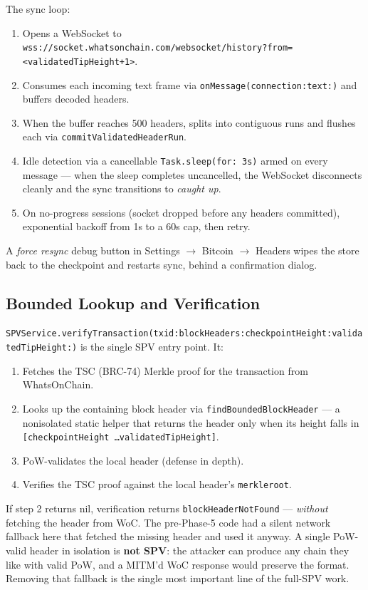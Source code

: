 \documentclass[a4paper, 11pt, openany]{book}
\begin{document}
The sync loop:

\begin{enumerate}
\item Opens a WebSocket to \texttt{wss://socket.whatsonchain.com/websocket/history?from=<validated\-Tip\-Height+1>}.
\item Consumes each incoming text frame via \texttt{on\-Message(connection:text:)} and buffers decoded headers.
\item When the buffer reaches 500 headers, splits into contiguous runs and flushes each via \texttt{com\-mit\-Val\-i\-dated\-Head\-er\-Run}.
\item Idle detection via a cancellable \texttt{Task.sleep(for: 3s)} armed on every message --- when the sleep completes uncancelled, the WebSocket disconnects cleanly and the sync transitions to \emph{caught up}.
\item On no-progress sessions (socket dropped before any headers committed), exponential backoff from 1s to a 60s cap, then retry.
\end{enumerate}

A \emph{force resync} debug button in Settings $\rightarrow$ Bitcoin $\rightarrow$ Headers wipes the store back to the checkpoint and restarts sync, behind a confirmation dialog.

\subsection{Bounded Lookup and Verification}

\texttt{SPV\-Service.verify\-Transaction(txid:block\-Headers:check\-point\-Height:validated\-Tip\-Height:)} is the single SPV entry point. It:

\begin{enumerate}
\item Fetches the TSC (BRC-74) Merkle proof for the transaction from WhatsOnChain.
\item Looks up the containing block header via \texttt{find\-Bounded\-Block\-Header} --- a nonisolated static helper that returns the header only when its height falls in \texttt{[checkpointHeight \ldots validatedTipHeight]}.
\item PoW-validates the local header (defense in depth).
\item Verifies the TSC proof against the local header's \texttt{merkleroot}.
\end{enumerate}

If step 2 returns nil, verification returns \texttt{block\-Header\-Not\-Found} --- \emph{without} fetching the header from WoC. The pre-Phase-5 code had a silent network fallback here that fetched the missing header and used it anyway. A single PoW-valid header in isolation is \textbf{not SPV}: the attacker can produce any chain they like with valid PoW, and a MITM'd WoC response would preserve the format. Removing that fallback is the single most important line of the full-SPV work.
\end{document}
